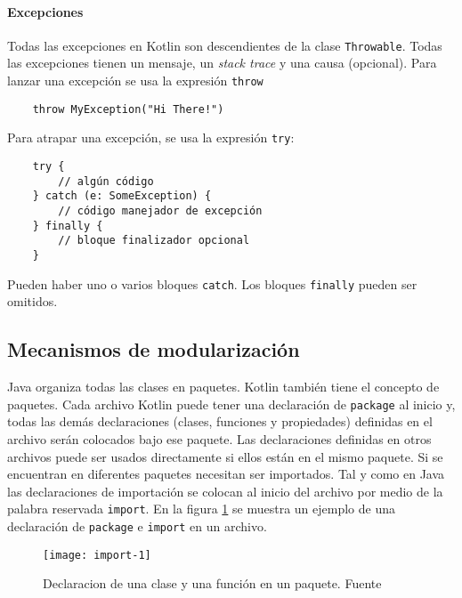 \paragraph{Excepciones}
Todas las excepciones en Kotlin son descendientes de la clase \texttt{Throwable}. Todas las excepciones tienen un mensaje, un \emph{stack trace} y una causa (opcional). Para lanzar una excepción se usa la expresión \texttt{throw}
\begin{verbatim}
    throw MyException("Hi There!")
\end{verbatim}

Para atrapar una excepción, se usa la expresión \texttt{try}:
\begin{verbatim}
    try {
        // algún código
    } catch (e: SomeException) {
        // código manejador de excepción
    } finally {
        // bloque finalizador opcional
    }
\end{verbatim}
Pueden haber uno o varios bloques \texttt{catch}. Los bloques \texttt{finally} pueden ser omitidos. 


\subsection{Mecanismos de modularización}
Java organiza todas las clases en paquetes. Kotlin también tiene el concepto de paquetes. Cada archivo Kotlin puede tener una declaración de \texttt{package} al inicio y, todas las demás declaraciones (clases, funciones y propiedades) definidas en el archivo serán colocados bajo ese paquete. Las declaraciones definidas en otros archivos puede ser usados directamente si ellos están en el mismo paquete. Si se encuentran en diferentes paquetes necesitan ser importados. Tal y como en Java las declaraciones de importación se colocan al inicio del archivo por medio de la palabra reservada \texttt{import}. En la figura \ref{fig:import-1} se muestra un ejemplo de una declaración de \texttt{package} e \texttt{import} en un archivo.

\begin{figure}[h!]
  \texttt{[image: import-1]}
  \caption{Declaracion de una clase y una función en un paquete. Fuente \cite{kotlin-in-action}}
  \label{fig:import-1}
\end{figure}  

